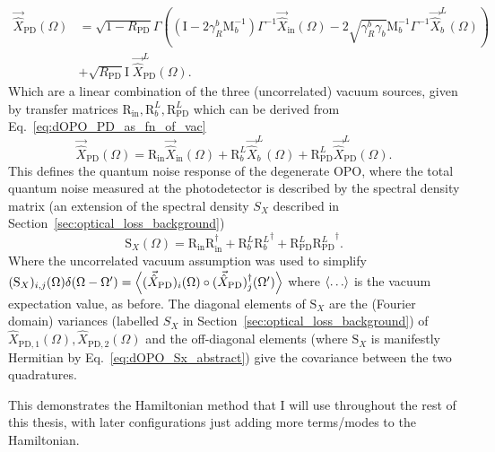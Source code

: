 \begin{align}
\label{eq:dOPO_PD_as_fn_of_vac}
\vec{\hat X}_\mathrm{PD}(\Omega)&=\sqrt{1-R_\text{PD}}\Gamma\left(\left(\text{I}-2\gamma^b_R\text{M}_b^{-1}\right)\Gamma^{-1}\vec{\hat X}_\mathrm{in}(\Omega)-2\sqrt{\gamma^b_R \gamma_b}\text{M}_b^{-1}\Gamma^{-1}\vec{\hat X}^L_b(\Omega)\right)\\
&+\sqrt{R_\text{PD}}\text{I}\;\vec{\hat X}^L_\text{PD}(\Omega).\nonumber
\end{align}
Which are a linear combination of the three (uncorrelated) vacuum sources, given by transfer matrices $\text{R}_\text{in},\text{R}^L_b, \text{R}^L_\text{PD}$ which can be derived from Eq.~\ref{eq:dOPO_PD_as_fn_of_vac}  \begin{equation}\vec{\hat X}_\mathrm{PD}(\Omega)=\text{R}_\text{in}\vec{\hat X}_\mathrm{in}(\Omega)+\text{R}^L_b\vec{\hat X}^L_b(\Omega)+\text{R}^L_\text{PD}\vec{\hat X}^L_\text{PD}(\Omega).\end{equation} This defines the quantum noise response of the degenerate OPO, where the total quantum noise measured at the photodetector is described by the spectral density matrix (an extension of the spectral density $S_X$ described in Section~\ref{sec:optical_loss_background}) \begin{equation}\label{eq:dOPO_Sx_abstract}\text{S}_X(\Omega)=\text{R}_\text{in} \text{R}_\text{in}^\dag+\text{R}^L_b {\text{R}^L_b}^\dag+\text{R}^L_\text{PD}{\text{R}^L_\text{PD}}^\dag.\end{equation} Where the uncorrelated vacuum assumption was used to simplify $(\text{S}_X)_{i,j}(\Omega)\delta(\Omega-\Omega')=\ev{(\vec{\hat X}_\text{PD})_i(\Omega)\circ(\vec{\hat X}_\text{PD})_j^\dag(\Omega')}$ where $\ev{\ldots}$ is the vacuum expectation value, as before. The diagonal elements of $\text{S}_X$ are the (Fourier domain) variances (labelled $S_X$ in Section~\ref{sec:optical_loss_background}) of ${\hat X}_{\mathrm{PD},1}(\Omega), {\hat X}_{\mathrm{PD},2}(\Omega)$ and the off-diagonal elements (where $\text{S}_X$ is manifestly Hermitian by Eq.~\ref{eq:dOPO_Sx_abstract}) give the covariance between the two quadratures.

This demonstrates the Hamiltonian method that I will use throughout the rest of this thesis, with later configurations just adding more terms/modes to the Hamiltonian. %

